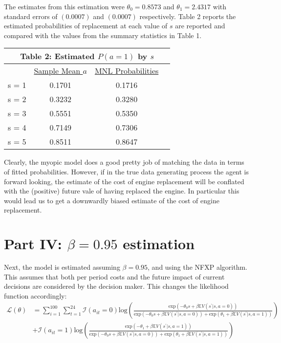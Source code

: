 \documentclass[11pt]{article}
\begin{document}
The estimates from this estimation were $\theta_{0}=0.8573$ and $\theta_{1}=2.4317$ with standard errors of $(0.0007)$ and $(0.0007)$ respectively.  Table 2 reports the estimated probabilities of replacement at each value of $s$ are reported and compared with the values from the summary statistics in Table 1.  

\begin{center}
\begin{tabular}{lccc}
\hline\hline
\multicolumn{4}{c}{\textbf{Table 2: Estimated $P(a=1)$ by $s$}}, $\beta=0$\\
\hline
& \underline{Sample Mean $a$}  & \underline{MNL Probabilities} \\
s = 1 & 0.1701 & 0.1716 \\
s = 2 & 0.3232 &  0.3280 \\
s = 3 & 0.5551 &  0.5350 \\
s = 4 & 0.7149 &  0.7306 \\
s = 5 & 0.8511 &  0.8647\\
\hline\hline
\end {tabular}
\end{center}

Clearly, the myopic model does a good pretty job of matching the data in terms of fitted probabilities.  However, if in the true data generating process the agent is forward looking, the estimate of the cost of engine replacement will be conflated with the (positive) future vale of having replaced the engine.  In particular this would lead us to get a downwardly biased estimate of the cost of engine replacement.


\section*{Part IV: $\beta=0.95$ estimation}

Next, the model is estimated assuming $\beta=0.95$, and using the NFXP algorithm.  This assumes that both per period costs and the future impact of current decisions are considered by the decision maker.  This changes the likelihood function accordingly:
\begin{equation*}
\begin{split}
\mathcal{L}(\theta) & = \sum_{i=1}^{100} \sum_{t=1}^{24} \mathcal{I}(a_{it}=0)\text{log}\left(\frac{\text{exp}(-\theta_{0}s + \beta \mathbb{E}V(s^{'}|s, a=0))}{\text{exp}(-\theta_{0}s+ \beta \mathbb{E}V(s^{'}|s, a=0)) + \text{exp}(\theta_{1}+ \beta \mathbb{E}V(s^{'}|s, a=1))}\right) \\ 
& + \mathcal{I}(a_{it}=1)\text{log}\left(\frac{\text{exp}(-\theta_{1}+ \beta \mathbb{E}V(s^{'}|s, a=1))}{\text{exp}(-\theta_{0}s+ \beta \mathbb{E}V(s^{'}|s, a=0)) + \text{exp}(\theta_{1}+ \beta \mathbb{E}V(s^{'}|s, a=1))}\right)
\end{split}
\end{equation*}
\end{document}
